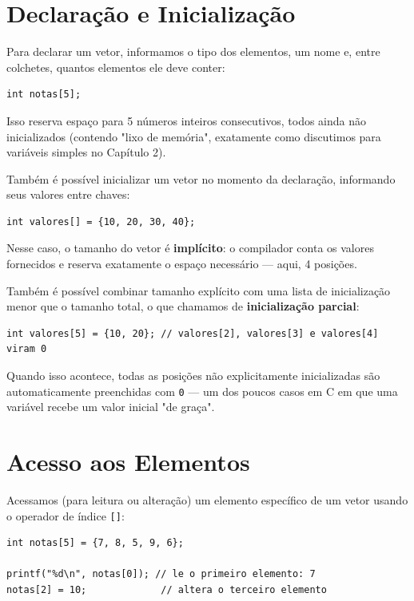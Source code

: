 \section{Declaração e Inicialização}

Para declarar um vetor, informamos o tipo dos elementos, um nome e, entre colchetes, quantos elementos ele deve conter:

\begin{lstlisting}
int notas[5];
\end{lstlisting}

Isso reserva espaço para 5 números inteiros consecutivos, todos ainda não inicializados (contendo "lixo de memória", exatamente como discutimos para variáveis simples no Capítulo 2).

Também é possível inicializar um vetor no momento da declaração, informando seus valores entre chaves:

\begin{lstlisting}
int valores[] = {10, 20, 30, 40};
\end{lstlisting}

Nesse caso, o tamanho do vetor é \textbf{implícito}: o compilador conta os valores fornecidos e reserva exatamente o espaço necessário — aqui, 4 posições.

Também é possível combinar tamanho explícito com uma lista de inicialização menor que o tamanho total, o que chamamos de \textbf{inicialização parcial}:

\begin{lstlisting}
int valores[5] = {10, 20}; // valores[2], valores[3] e valores[4] viram 0
\end{lstlisting}

Quando isso acontece, todas as posições não explicitamente inicializadas são automaticamente preenchidas com \texttt{0} — um dos poucos casos em C em que uma variável recebe um valor inicial "de graça".

\section{Acesso aos Elementos}

Acessamos (para leitura ou alteração) um elemento específico de um vetor usando o operador de índice \texttt{[]}:

\begin{lstlisting}
int notas[5] = {7, 8, 5, 9, 6};

printf("%d\n", notas[0]); // le o primeiro elemento: 7
notas[2] = 10;             // altera o terceiro elemento
\end{lstlisting}

